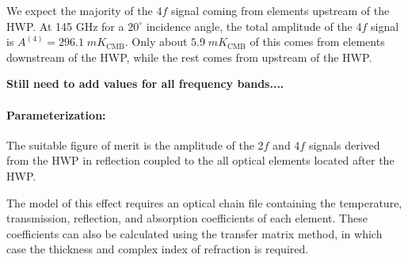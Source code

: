 We expect the majority of the 4$f$ signal coming from elements upstream of the HWP.
At 145 GHz for a $20^\circ$ incidence angle, the total amplitude of the 4$f$ signal is $A^{(4)} = 296.1 \; mK_\text{CMB}$.
Only about $5.9 \; mK_\text{CMB}$ of this comes from elements downstream of the HWP, while the rest comes from upstream of the HWP.

\textbf{Still need to add values for all frequency bands....}

\paragraph{Parameterization:}
The suitable figure of merit is the amplitude of the 2$f$ and 4$f$ signals derived from the HWP in reflection coupled to the all optical elements located after the HWP.

The model of this effect requires an optical chain file containing the temperature, transmission, reflection, and absorption coefficients of each element.
These coefficients can also be calculated using the transfer matrix method, in which case the thickness and complex index of refraction is required.

